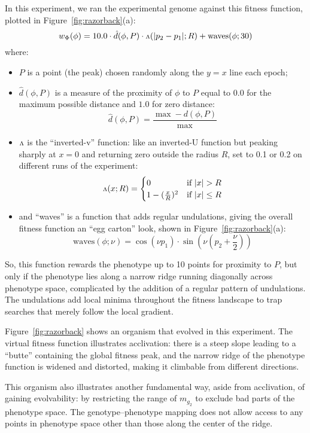 \documentclass[letterpaper]{article}
\newcommand{\invv}{\ensuremath{\rotatebox[origin=c]{180}{\textrm{v}}}\xspace}
\begin{document}
In this experiment, we ran the experimental genome against this fitness
function, plotted in Figure~\ref{fig:razorback}(a):
\[
   w_\Phi(\phi) = 10.0 \cdot \hat{d}(\phi, P)
                       \cdot \invv(|p_2 - p_1|; R)
                       + \text{waves}(\phi; 30)
\]
where:
\begin{itemize}
  \item[ ]
    $P$ is a point (the peak) chosen randomly along the $y=x$ line each epoch;

  \item[ ]
$\hat{d}(\phi, P)$ is a measure of the proximity of $\phi$ to $P$ equal to
$0.0$ for the maximum possible distance and $1.0$ for zero distance:
\[
  \hat{d}(\phi, P) = \frac{\max - d(\phi, P)}{\max}
\]

  \item[ ]
    \invv is the ``inverted-v'' function: like an inverted-U function but
    peaking sharply at $x=0$ and returning zero outside the radius $R$, set to
    0.1 or 0.2 on different runs of the experiment:
\[
   \invv(x; R) =
   \begin{cases}
      0 & \text{if } |x|>R \\
      1 - (\frac{x}{R})^2 &
      \text{if } |x|\leq R
   \end{cases}
\]

  \item[ ]
    and ``waves'' is a function that adds regular undulations, giving the
    overall fitness function an ``egg carton'' look, shown in
    Figure~\ref{fig:razorback}(a):
\[
  \text{waves}(\phi; \nu) = \cos(\nu p_1)
                            \cdot
                            \sin(\nu (p_2 + \frac{\nu}{2}))
\]
\end{itemize}

So, this function rewards the phenotype up to 10 points for proximity to
$P$, but only if the phenotype lies along a narrow ridge running diagonally
across phenotype space, complicated by the addition of a regular pattern of
undulations. The undulations add local minima throughout the fitness
landscape to trap searches that merely follow the local gradient.

Figure~\ref{fig:razorback} shows an organism that evolved in this experiment.
The virtual fitness function illustrates acclivation: there is a steep slope
leading to a ``butte'' containing the global fitness peak, and the narrow ridge
of the phenotype function is widened and distorted, making it climbable from
different directions.

This organism also illustrates another fundamental way, aside from
acclivation, of gaining evolvability: by restricting the range of $m_{g_2}$
to exclude bad parts of the phenotype space. The genotype--phenotype mapping
does not allow access to any points in phenotype space other than those along
the center of the ridge.
\end{document}
